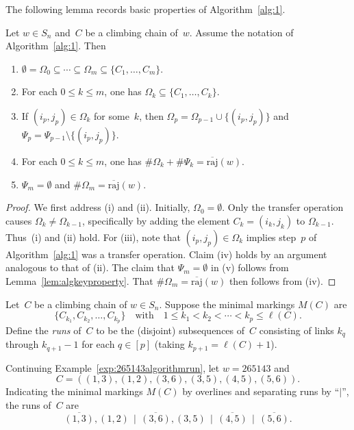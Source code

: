 \documentclass[ALCO]{cedram}
\newcommand{\absoverrajcode}[1]{\overline{\mathrm{raj}}(#1)}
\begin{document}
The following lemma records basic properties of Algorithm~\ref{alg:1}.
\begin{lemma}
	\label{lem:algbasicproperties}
	Let $w\in S_n$ and~$C$ be a climbing chain of~$w$. Assume the notation of Algorithm~\ref{alg:1}. Then 
	\begin{enumerate}[label=\textup{(\roman*)}]
		\item $\emptyset=\Omega_0\subseteq \cdots\subseteq \Omega_m\subseteq \{C_1,\ldots,C_m\}$.
		\item For each $0\leq k\leq m$, one has $\Omega_k\subseteq \{C_1,\ldots,C_k \}$.
		\item If $(i_p,j_p)\in \Omega_k$ for some~$k$, then $\Omega_p=\Omega_{p-1}\cup \{(i_p,j_p)\}$ and $\Psi_p=\Psi_{p-1}\setminus \{(i_p,j_p)\}$.
		\item For each $0\leq k\leq m$, one has $\#\Omega_k + \#\Psi_k = \absoverrajcode{w}.$
		\item $\Psi_m=\emptyset$ and $\#\Omega_m=\absoverrajcode{w}$.
	\end{enumerate}
\end{lemma}

\begin{proof}
	We first address (i) and (ii). Initially, $\Omega_0=\emptyset$. Only the transfer operation causes $\Omega_k\neq \Omega_{k-1}$, specifically by adding the element $C_k=(i_k,j_k)$ to $\Omega_{k-1}$. Thus~(i) and (ii) hold. For (iii), note that $(i_p,j_p)\in \Omega_k$ implies step~$p$ of Algorithm~\ref{alg:1} was a transfer operation. Claim (iv) holds by an argument analogous to that of (ii). The claim that $\Psi_m=\emptyset$ in (v) follows from Lemma~\ref{lem:algkeyproperty}. That $\#\Omega_m=\absoverrajcode{w}$ then follows from (iv).
\end{proof}

\begin{definition}
	Let~$C$ be a climbing chain of $w\in S_n$. Suppose the minimal markings $M(C)$ are 
	\[\{C_{k_1},C_{k_2},\ldots,C_{k_p}\}\quad \mbox{with}\quad 1\leq k_1<k_2<\cdots<k_p\leq \ell(C).\]
	Define the \emph{runs} of~$C$ to be the (disjoint) subsequences of~$C$ consisting of links $k_q$ through $k_{q+1}-1$ for each $q\in [p]$ (taking $k_{p+1}=\ell(C)+1$).
\end{definition}

\begin{example}
	\label{exp:265143links}
	Continuing Example~\ref{exp:265143algorithmrun}, let $w=265143$ and
	\[C=((1,3),(1,2),(3,6),(3,5),(4,5),(5,6)).\]
	Indicating the minimal markings $M(C)$ by overlines and separating runs by ``$\mid$'', the runs of~$C$ are
	\[\overline{(1,3)},(1,2) \,\mid\, \overline{(3,6)},(3,5)\,\mid\, \overline{(4,5)} \,\mid\, \overline{(5,6)}.\]
\end{example}
\end{document}
